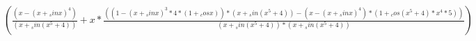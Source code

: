 \documentclass{proc}
\begin{document}
$ {( \frac{{( {  x  } - { {( {  x  } + {  _sin {  x  } } )} ^ {  4  } } )}}{{( {  x  } + {  _sin {( { {  x  } ^ {  5  } } + {  4  } )} } )} } + { {  x  } * \frac{{( { {( {  1  } - { { { {( {  x  } + {  _sin {  x  } } )} ^ {  3  } } * {  4  } } * {( {  1  } + {  _cos {  x  } } )} } )} * {( {  x  } + {  _sin {( { {  x  } ^ {  5  } } + {  4  } )} } )} } - { {( {  x  } - { {( {  x  } + {  _sin {  x  } } )} ^ {  4  } } )} * {( {  1  } + { {  _cos {( { {  x  } ^ {  5  } } + {  4  } )} } * { { {  x  } ^ {  4  } } * {  5  } } } )} } )}}{{ {( {  x  } + {  _sin {( { {  x  } ^ {  5  } } + {  4  } )} } )} * {( {  x  } + {  _sin {( { {  x  } ^ {  5  } } + {  4  } )} } )} } } } )} $
\end{document}
